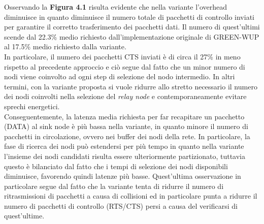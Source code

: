 \documentclass[binding=0.6cm,TFA]{sapthesis}
\begin{document}
Osservando la \textbf{Figura 4.1} risulta evidente che nella variante l'overhead diminuisce in quanto diminuisce il numero totale di pacchetti di
controllo inviati per garantire il corretto trasferimento dei pacchetti dati. Il numero di quest'ultimi scende dal 22.3\% medio richiesto
dall'implementazione originale di GREEN-WUP al 17.5\% medio richiesto dalla variante.\\

In particolare, il numero dei pacchetti CTS inviati è di circa il 27\% in meno rispetto al precedente approccio e ciò segue dal fatto che un minor
numero di nodi viene coinvolto ad ogni step di selezione del nodo intermedio. In altri termini, con la variante proposta si vuole ridurre allo stretto
necessario il numero dei nodi coinvolti nella selezione del \emph{relay node} e contemporaneamente evitare sprechi energetici.\\

\newpage
Conseguentemente, la latenza media richiesta per far recapitare un pacchetto (DATA) al sink node è più bassa nella variante, in quanto minore il
numero di pacchetti in circolazione, ovvero nei buffer dei nodi della rete. In particolare, la fase di ricerca dei nodi può estendersi per più tempo
in quanto nella variante l'insieme dei nodi candidati risulta essere ulteriormente partizionato, tuttavia questo è bilanciato dal fatto che i tempi
di selezione dei nodi disponibili diminuisce, favorendo quindi latenze più basse. Quest'ultima osservazione in particolare segue dal fatto che la variante
tenta di ridurre il numero di ritrasmissioni di pacchetti a causa di collisioni ed in particolare punta a ridurre il numero di pacchetti di controllo
(RTS/CTS) persi a causa del verificarsi di quest'ultime.
\end{document}
